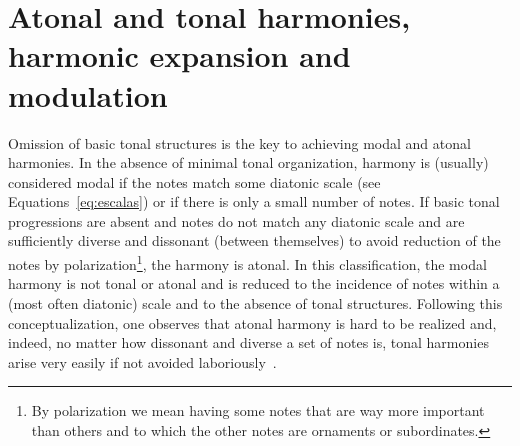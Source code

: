 \documentclass[format=acmsmall, review=false, screen=true]{acmart}
\begin{document}
\section{Atonal and tonal harmonies, harmonic expansion and modulation}\label{subsec:harmonia}
Omission of basic tonal structures is the key to achieving modal and atonal harmonies. In the absence of minimal tonal organization,
harmony is (usually) considered modal if the notes match some diatonic scale (see Equations~\ref{eq:escalas}) or if there is only a small number of notes. If basic tonal progressions are absent and notes do not match any diatonic scale and are sufficiently diverse and dissonant (between themselves) to avoid reduction of the notes by polarization\footnote{By polarization we mean having some notes that are way more important than others and to which the other notes are ornaments or subordinates.}, the harmony is atonal. In this classification, the modal harmony is not tonal or atonal and is reduced to the incidence of notes within a (most often diatonic) scale and to the absence of tonal structures. Following this conceptualization, one observes that atonal harmony is hard to be realized and, indeed, no matter how dissonant and diverse
a set of notes is, tonal harmonies arise very easily if not avoided laboriously~\cite{harmEXT}.
\end{document}
